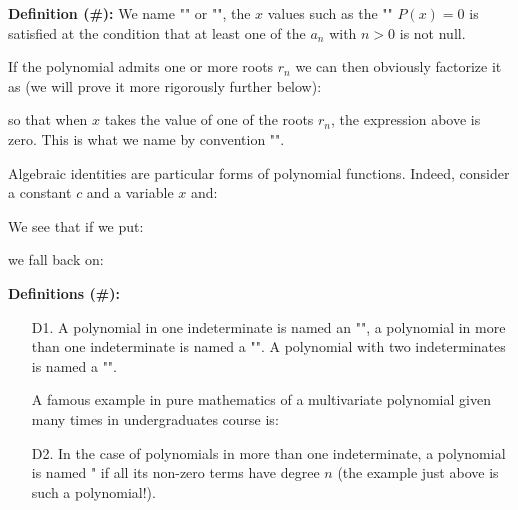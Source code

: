 	\textbf{Definition (\#\mydef):} We name "" or "", the $x$ values such as the "" $P(x)=0$ is satisfied at the condition that at least one of the $a_n$ with $n>0$ is not null.
	
	If the polynomial admits one or more roots $r_n$ we can then obviously factorize it as (we will prove it more rigorously further below):
	
	so that when $x$ takes the value of one of the roots $r_n$, the expression above is zero. This is what we name by convention "".
	
	Algebraic identities are particular forms of polynomial functions. Indeed, consider a constant $c$ and a variable $x$ and:
	
	We see that if we put:
	
	we fall back on:
	
	\textbf{Definitions (\#\mydef):}
	\begin{enumerate}
		\item[D1.] A polynomial in one indeterminate is named an "", a polynomial in more than one indeterminate is named a "". A polynomial with two indeterminates is named a "".
		
		A famous example in pure mathematics of a multivariate polynomial given many times in undergraduates course is: 
		
	
		\item[D2.] In the case of polynomials in more than one indeterminate, a polynomial is named  " if all its non-zero terms have degree $n$ (the example just above is such a polynomial!).
	\end{enumerate}

	\pagebreak
